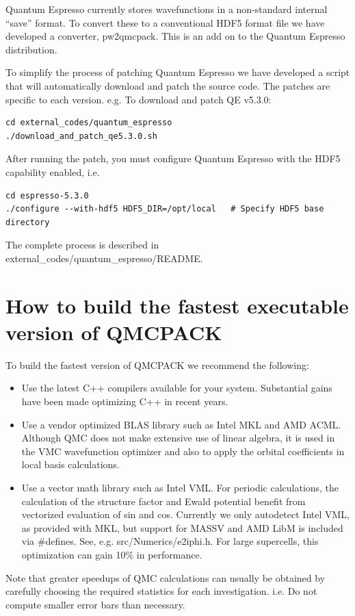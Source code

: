 Quantum Espresso currently stores wavefunctions in a non-standard internal
``save'' format. To convert these to a conventional HDF5 format file
we have developed a converter, pw2qmcpack. This is an add on to the
Quantum Espresso distribution.

To simplify the process of patching Quantum Espresso we have developed
a script that will automatically download and patch the source
code. The patches are specific to each version. e.g. To download and
patch QE v5.3.0:
\begin{verbatim}
cd external_codes/quantum_espresso
./download_and_patch_qe5.3.0.sh
\end{verbatim}
After running the patch, you must configure Quantum Espresso with
the HDF5 capability enabled, i.e.
\begin{verbatim}
cd espresso-5.3.0
./configure --with-hdf5 HDF5_DIR=/opt/local   # Specify HDF5 base directory
\end{verbatim}

The complete process is described in external\_codes/quantum\_espresso/README.


\section{How to build the fastest executable version of QMCPACK}
\label{sec:buildperformance}
To build the fastest version of QMCPACK we recommend the following:
\begin{itemize}
\item Use the latest C++ compilers available for your
  system. Substantial gains have been made optimizing C++ in recent
  years.
\item Use a vendor optimized BLAS library such as Intel MKL and AMD ACML. Although
  QMC does not make extensive use of linear algebra, it is used in the
  VMC wavefunction optimizer and also to apply the orbital coefficients in local basis
  calculations.
\item Use a vector math library such as Intel VML.  For periodic
  calculations, the calculation of the structure factor and Ewald
  potential benefit from vectorized evaluation of sin and
  cos. Currently we only autodetect Intel VML, as provided with MKL,
  but support for MASSV and AMD LibM is included via \#defines. See,
  e.g. src/Numerics/e2iphi.h. For
  large supercells, this optimization can gain 10\% in performance.
\end{itemize}

Note that greater speedups of QMC calculations can usually be obtained by
carefully choosing the required statistics for each
investigation. i.e. Do not compute smaller error bars than necessary.

